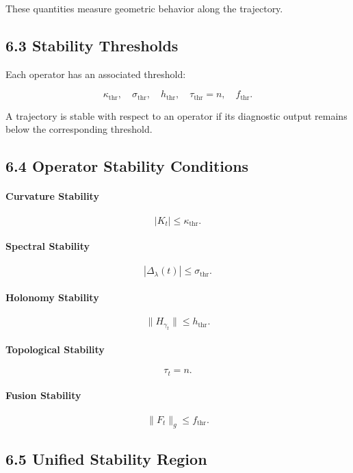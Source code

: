 These quantities measure geometric behavior along the trajectory.

\subsection*{6.3 Stability Thresholds}

Each operator has an associated threshold:

\[
\kappa_{\mathrm{thr}}, \quad
\sigma_{\mathrm{thr}}, \quad
h_{\mathrm{thr}}, \quad
\tau_{\mathrm{thr}} = n, \quad
f_{\mathrm{thr}}.
\]

A trajectory is stable with respect to an operator if its diagnostic
output remains below the corresponding threshold.

\subsection*{6.4 Operator Stability Conditions}

\paragraph{Curvature Stability}
\[
|K_t| \le \kappa_{\mathrm{thr}}.
\]

\paragraph{Spectral Stability}
\[
|\Delta_\lambda(t)| \le \sigma_{\mathrm{thr}}.
\]

\paragraph{Holonomy Stability}
\[
\|H_{\gamma_t}\| \le h_{\mathrm{thr}}.
\]

\paragraph{Topological Stability}
\[
\tau_t = n.
\]

\paragraph{Fusion Stability}
\[
\|F_t\|_g \le f_{\mathrm{thr}}.
\]

\subsection*{6.5 Unified Stability Region}

